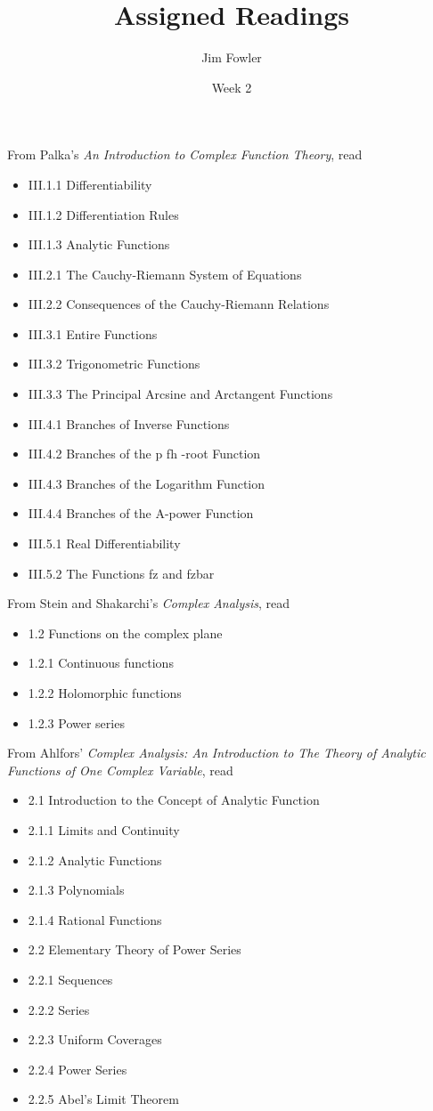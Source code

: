 \documentclass{homework}
\author{Jim Fowler}
\title{Assigned Readings}
\date{Week 2}
\begin{document}
\maketitle


From Palka's \textit{An Introduction to Complex Function Theory}, read
\begin{itemize}
\item III.1.1 Differentiability
\item III.1.2 Differentiation Rules
\item III.1.3 Analytic Functions
\item III.2.1 The Cauchy-Riemann System of Equations
\item III.2.2 Consequences of the Cauchy-Riemann Relations
\item III.3.1 Entire Functions
\item III.3.2 Trigonometric Functions
\item III.3.3 The Principal Arcsine and Arctangent Functions
\item III.4.1 Branches of Inverse Functions
\item III.4.2 Branches of the p fh -root Function
\item III.4.3 Branches of the Logarithm Function
\item III.4.4 Branches of the A-power Function
\item III.5.1 Real Differentiability
\item III.5.2 The Functions fz and fzbar
\end{itemize}

From Stein and Shakarchi's \textit{Complex Analysis}, read
\begin{itemize}
\item 1.2 Functions on the complex plane
\item 1.2.1 Continuous functions
\item 1.2.2 Holomorphic functions
\item 1.2.3 Power series
\end{itemize}

From Ahlfors' \textit{Complex Analysis: An Introduction to The Theory of Analytic Functions of One Complex Variable}, read
\begin{itemize}
\item 2.1 Introduction to the Concept of Analytic Function
\item 2.1.1 Limits and Continuity
\item 2.1.2 Analytic Functions
\item 2.1.3 Polynomials
\item 2.1.4 Rational Functions
\item 2.2 Elementary Theory of Power Series
\item 2.2.1 Sequences
\item 2.2.2 Series
\item 2.2.3 Uniform Coverages
\item 2.2.4 Power Series
\item 2.2.5 Abel's Limit Theorem
\end{itemize}
\end{document}
